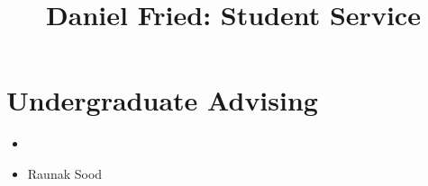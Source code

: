 \documentclass[11pt]{article}
\title{\vspace{-4em}Daniel Fried: Student Service\vspace{-0.5em}}
\date{}
\begin{document}
\maketitle

\section*{Undergraduate Advising}
\begin{itemize}
\item[]\hspace{-2.5em}{Current}
		\item Raunak Sood
\end{itemize}
\end{document}

